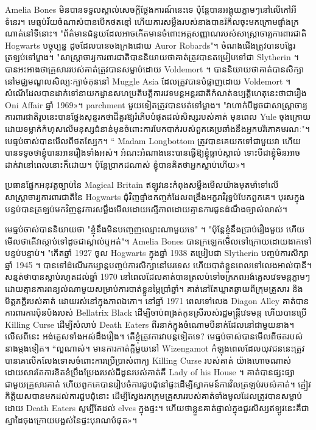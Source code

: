 {Amelia Bones មិនបានទទួលស្គាល់សេចក្តីថ្លែងការណ៍នេះទេ ប៉ុន្តែបានអង្គុយភ្លាមៗនៅលើកៅអីទំនេរ។ មេធ្មប់វ័យចំណាស់បានបើកថតខ្មៅ ហើយការសម្លឹងរបស់នាងបានរំកិលចុះមកក្រោមផ្ទាំងក្រណាត់នៅទីនោះ។ "ព័ត៌មានជំនួយដែលអាចកើតមានចំពោះអត្តសញ្ញាណរបស់សាស្ត្រាចារ្យការពារជាតិ Hogwarts បច្ចុប្បន្ន ដូចដែលបានចងក្រងដោយ Auror Robards"។ ចំណង​ជើង​ត្រូវ​បាន​បង្វែរ ត្រឡប់​ទៅ​ម្ខាង។ "សាស្រ្តាចារ្យការពារជាតិបាននិយាយថាគាត់ត្រូវបានតម្រៀបទៅជា Slytherin ។ បានអះអាងថាគ្រួសាររបស់គាត់ត្រូវបានសម្លាប់ដោយ Voldemort ។ បាននិយាយថាគាត់បានសិក្សានៅមជ្ឈមណ្ឌលសិល្បៈក្បាច់គុននៅ Muggle Asia ដែលត្រូវបានបំផ្លាញដោយ Voldemort ។ សំណើ​ដែល​បាន​ដាក់​ទៅ​នាយកដ្ឋាន​សហប្រតិបត្តិការ​វេទមន្ត​អន្តរជាតិ​កំណត់​ឧប្បត្តិហេតុ​នេះ​ថា​ជា​រឿង​ Oni Affair ឆ្នាំ 1969»។ parchment មួយទៀតត្រូវបានបត់ទៅម្ខាង។ "វាហាក់បីដូចជាសាស្រ្តាចារ្យការពារជាតិរូបនេះបានថ្លែងសុន្ទរកថាដ៏គួរឱ្យរំភើបបំផុតដល់សិស្សរបស់គាត់ មុនពេល Yule ចុងក្រោយដោយទម្លាក់កំហុសលើមនុស្សជំនាន់មុនចំពោះការបែកបាក់របស់ពួកគេប្រឆាំងនឹងអ្នកបរិភោគមរណៈ"។ មេធ្មប់ចាស់បានមើលពីថតស្បែក។ “ Madam Longbottom ត្រូវ​បាន​គេ​យក​ទៅ​ជា​មួយ​វា ហើយ​បាន​ទទូច​ថា​ខ្ញុំ​បាន​អាន​រឿង​ទាំង​អស់។ អំណះអំណាងនេះបានធ្វើឱ្យខ្ញុំធ្លាប់ស្គាល់ ទោះបីជាខ្ញុំមិនអាចដាក់វានៅពេលនោះក៏ដោយ។ ប៉ុន្តែ​ប្រាកដ​ណាស់ ខ្ញុំ​បាន​គិត​ថា​អ្នក​ស្លាប់​ហើយ»។

ប្រធានផ្នែកអនុវត្តច្បាប់នៃ Magical Britain ឥឡូវនេះកំពុងសម្លឹងមើលយ៉ាងមុតមាំទៅលើសាស្រ្តាចារ្យការពារជាតិនៃ Hogwarts ជុំវិញផ្ទាំងកញ្ចក់ដែលពង្រឹងអក្ខរាវិរុទ្ធបំបែកពួកគេ។ បុរស​ក្នុង​បន្ទប់​បាន​ត្រឡប់​មក​វិញ​នូវ​ការ​សម្លឹង​មើល​ដោយ​ស្មើភាព​ដោយ​គ្មាន​ការ​ជូន​ដំណឹង​ច្បាស់​លាស់។

មេធ្មប់ចាស់បាននិយាយថា "ខ្ញុំនឹងមិនបញ្ចេញឈ្មោះណាមួយទេ" ។ "ប៉ុន្តែខ្ញុំនឹងប្រាប់រឿងមួយ ហើយមើលថាតើវាស្តាប់ទៅដូចជាស្គាល់ឬអត់"។ Amelia Bones បានក្រឡេកមើលទៅក្រោយដោយងាកទៅបន្ទប់បន្ទាប់។ "កើតឆ្នាំ 1927 ចូល Hogwarts ក្នុងឆ្នាំ 1938 តម្រៀបជា Slytherin បញ្ចប់ការសិក្សាឆ្នាំ 1945 ។ បានទៅដំណើរកម្សាន្តបញ្ចប់ការសិក្សានៅបរទេស ហើយបាត់ខ្លួនពេលទៅលេងអាល់បានី។ សន្មត់ថាបានស្លាប់រហូតដល់ឆ្នាំ 1970 នៅពេលដែលគាត់បានត្រលប់ទៅចក្រភពអង់គ្លេសវេទមន្តភ្លាមៗដោយគ្មានការពន្យល់ណាមួយសម្រាប់ការបាត់ខ្លួនម្ភៃប្រាំឆ្នាំ។ គាត់នៅតែឃ្លាតឆ្ងាយពីក្រុមគ្រួសារ និងមិត្តភក្តិរបស់គាត់ ដោយរស់នៅក្នុងភាពឯកោ។ នៅឆ្នាំ 1971 ពេលទៅលេង Diagon Alley គាត់បានការពារការប៉ុនប៉ងរបស់ Bellatrix Black ដើម្បីចាប់ពង្រត់កូនស្រីរបស់រដ្ឋមន្ត្រីវេទមន្ត ហើយបានប្រើ Killing Curse ដើម្បីសំលាប់ Death Eaters ពីរនាក់ក្នុងចំណោមបីនាក់ដែលនៅជាមួយនាង។ លើសពីនេះ អង់គ្លេសទាំងអស់ដឹងរឿង។ តើខ្ញុំត្រូវការវាបន្តទៀតទេ? មេធ្មប់ចាស់បានមើលពីថតរបស់នាងម្តងទៀត។ “ល្អណាស់។ មានការកាត់ក្តីមួយនៅ Wizengamot កំឡុងពេលដែលយុវជននេះត្រូវបានគេលើកលែងទោសចំពោះការប្រើប្រាស់ពាក្យ Killing Curse របស់គាត់ យ៉ាងហោចណាស់ដោយសារតែការខិតខំប្រឹងប្រែងរបស់ជីដូនរបស់គាត់គឺ Lady of his House ។ គាត់​បាន​ផ្សះផ្សា​ជាមួយ​គ្រួសារ​គាត់ ហើយ​ពួក​គេ​បាន​រៀបចំ​ការ​ជួប​ជុំ​នៅ​ផ្ទះ​ដើម្បី​ស្វាគមន៍​ការ​វិល​ត្រឡប់​របស់​គាត់។ ភ្ញៀវកិត្តិយសបានមកដល់ការជួបជុំនោះ ដើម្បីស្វែងរកក្រុមគ្រួសាររបស់គាត់ទាំងមូលដែលត្រូវបានសម្លាប់ដោយ Death Eaters សូម្បីតែដល់ elves ក្នុងផ្ទះ។ ហើយ​ថា​ខ្លួន​គាត់​ផ្ទាល់​ក្នុង​ជួរ​សិស្ស​ឥឡូវ​នេះ​គឺ​ជា​ស្នាដៃ​ចុងក្រោយ​បង្អស់​នៃ​ផ្ទះ​បុរាណ​បំផុត»។

}
